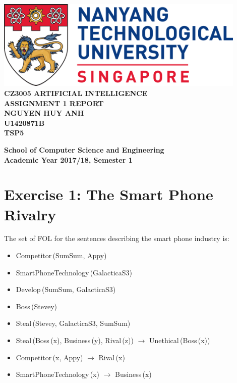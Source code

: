 \documentclass[11pt]{report}
\begin{document}
\begin{titlepage}
    \begin{center}
    
    \includegraphics[width=0.9\textwidth]{ntu_logo}
    \\[6cm]
    
    \uppercase{
    \textbf{CZ3005 Artificial Intelligence}\\
    \textbf{Assignment 1 Report}
    \\[2cm]
    \textbf{Nguyen Huy Anh}\\
    \textbf{U1420871B}\\
    \textbf{TSP5}
    }
    
    \vfill
    
    \textbf{School of Computer Science and Engineering}
    \\
    \textbf{Academic Year 2017/18, Semester 1}
    
    \end{center}
\end{titlepage}

\section*{Exercise 1: The Smart Phone Rivalry}

The set of FOL for the sentences describing the smart phone industry is:
\begin{itemize}
    \item Competitor\,(SumSum, Appy)
    \item SmartPhoneTechnology\,(GalacticaS3)
    \item Develop\,(SumSum, GalacticaS3)
    \item Boss\,(Stevey)
    \item Steal\,(Stevey, GalacticaS3, SumSum)
    \item Steal\,(Boss\,(x), Business\,(y), Rival\,(z)) \(\to \)
    Unethical\,(Boss\,(x))
    \item Competitor\,(x, Appy) \(\to \) Rival\,(x)
    \item SmartPhoneTechnology\,(x) \(\to \) Business\,(x)
\end{itemize}
\end{document}
